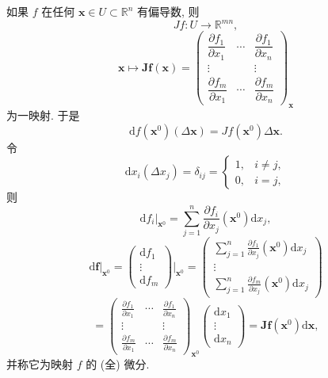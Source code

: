 如果 $f$ 在任何 $\boldsymbol{x} \in U \subset \mathbb{R}^{n}$ 有偏导数, 则
\[
  Jf: U \to \mathbb{R}^{mn},
\]
\[
  \boldsymbol{x} \mapsto \boldsymbol{J}\boldsymbol{f}(\boldsymbol{x}) = \begin{pmatrix}
    \dfrac{\partial f_{1}}{\partial x_{1}} & \cdots & \dfrac{\partial f_{1}}{\partial x_{n}} \\[2mm]
    \vdots & & \vdots \\[1mm]
    \dfrac{\partial f_{m}}{\partial x_{1}} & \cdots & \dfrac{\partial f_{m}}{\partial x_{n}}
  \end{pmatrix}_{\boldsymbol{x}}
\]
为一映射. 于是
\[
  \mathrm{d}f(\boldsymbol{x}^{0})(\Delta\boldsymbol{x}) = Jf(\boldsymbol{x}^{0})\Delta\boldsymbol{x}.
\]
令
\[
  \mathrm{d}x_{i}(\Delta x_{j}) = \delta_{ij} = \begin{cases}
    1, & i \neq j, \\
    0, & i = j,
  \end{cases}
\]
则
\[
  \mathrm{d}f_{i}\Big|_{\boldsymbol{x}^{0}} = \sum_{j=1}^{n}\frac{\partial f_{i}}{\partial x_{j}}(\boldsymbol{x}^{0})\mathrm{d}x_{j},
\]
\[
  \mathrm{d}\boldsymbol{f}\Big|_{\boldsymbol{x}^{0}} = \begin{pmatrix} \mathrm{d}f_{1} \\ \vdots \\ \mathrm{d}f_{m} \end{pmatrix}\Big|_{\boldsymbol{x}^{0}} = \begin{pmatrix}
    \displaystyle\sum_{j=1}^{n}\frac{\partial f_{1}}{\partial x_{j}}(\boldsymbol{x}^{0})\mathrm{d}x_{j} \\ \vdots \\
    \displaystyle\sum_{j=1}^{n}\frac{\partial f_{m}}{\partial x_{j}}(\boldsymbol{x}^{0})\mathrm{d}x_{j}
  \end{pmatrix}
\]
\[
  = \begin{pmatrix}
    \displaystyle\frac{\partial f_{1}}{\partial x_{1}} & \cdots & \displaystyle\frac{\partial f_{1}}{\partial x_{n}} \\[3mm]
    \vdots & & \vdots \\[2mm]
    \displaystyle\frac{\partial f_{m}}{\partial x_{1}} & \cdots & \displaystyle\frac{\partial f_{m}}{\partial x_{n}}
  \end{pmatrix}_{\boldsymbol{x}^{0}} \begin{pmatrix} \mathrm{d}x_{1} \\ \vdots \\ \mathrm{d}x_{n} \end{pmatrix} = \boldsymbol{J}\boldsymbol{f}(\boldsymbol{x}^{0})\mathrm{d}\boldsymbol{x},
\]
并称它为映射 $f$ 的 (全) 微分.

